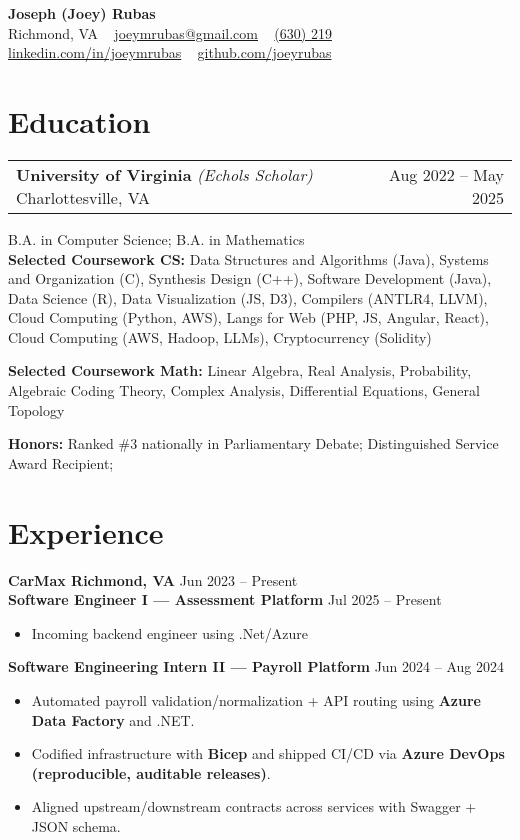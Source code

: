\documentclass[11pt]{article}
\makeatletter
\newcommand{\NameSize}{18}
\newcommand{\NameLead}{20}
\newcommand{\NameWeight}{\bfseries}
\newcommand{\ContactSize}{10}
\newcommand{\ContactLead}{12}
\newcommand{\ContactSep}{\; \textbar\ \;}  %
\newcommand{\EmployerSize}{11}
\newcommand{\EmployerLead}{13}
\newcommand{\EmployerWeight}{\bfseries}
\newcommand{\EmployerPreSkip}{2pt}
\newcommand{\EmployerPostSkip}{-2pt}
\newcommand{\RoleTitleSize}{11}
\newcommand{\RoleTitleLead}{13}
\newcommand{\RoleTitleWeight}{\bfseries}
\newcommand{\RoleDateSize}{10}
\newcommand{\RoleDateLead}{12}
\newcommand{\RolePreSkip}{2pt}
\newcommand{\RolePostSkip}{-8pt}
\newcommand{\BulletSize}{10}
\newcommand{\BulletLead}{12}
\newenvironment{twocol}[2]{%
  \noindent\begin{tabular*}{\textwidth}{@{\extracolsep{\fill}} l r}
  #1 & #2\\
  \end{tabular*}\ignorespaces
}{\par}
\newcommand{\NameLine}[1]{%
  {\fontsize{\NameSize}{\NameLead}\selectfont \NameWeight #1}%
}
\newcommand{\ContactsLine}[1]{%
  {\fontsize{\ContactSize}{\ContactLead}\selectfont #1}%
}
\newcommand{\EmployerHeader}[2]{%
  \vspace*{\EmployerPreSkip}%
  \noindent
  {\fontsize{\EmployerSize}{\EmployerLead}\selectfont \EmployerWeight #1}%
  \hfill
  {\fontsize{\EmployerSize}{\EmployerLead}\selectfont #2}%
  \\[\EmployerPostSkip]%
}
\newcommand{\RoleHeader}[2]{%
  \vspace*{\RolePreSkip}%
  \noindent
  {\fontsize{\RoleTitleSize}{\RoleTitleLead}\selectfont \RoleTitleWeight #1}%
  \hfill
  {\fontsize{\RoleDateSize}{\RoleDateLead}\selectfont #2}%
  \\[\RolePostSkip]%
}
\newenvironment{ResumeItemize}{%
  \begin{itemize}\fontsize{\BulletSize}{\BulletLead}\selectfont
}{%
  \end{itemize}
}
\makeatother
\begin{document}
\pagestyle{empty}       
\raggedbottom          
\begin{center}
  \NameLine{Joseph (Joey) Rubas}\\[2pt]
  \ContactsLine{%
    Richmond, VA \ContactSep
    \href{mailto:joeymrubas@gmail.com}{joeymrubas@gmail.com} \ContactSep
    \href{tel:+16302199451}{(630) 219\textendash 9451} \ContactSep
    \href{https://www.linkedin.com/in/joeymrubas/}{linkedin.com/in/joeymrubas} \ContactSep
    \href{https://github.com/joeyrubas}{github.com/joeyrubas}%
  }
\end{center}

\section{Education}
\begin{twocol}{\textbf{University of Virginia} \textit{(Echols Scholar)} \quad Charlottesville, VA}{Aug 2022 -- May 2025}\end{twocol}
B.A. in Computer Science; B.A. in Mathematics \\
\textbf{Selected Coursework CS:} Data Structures and Algorithms (Java), Systems and Organization (C), Synthesis Design (C++), Software Development (Java), Data Science (R), Data Visualization (JS, D3), Compilers (ANTLR4, LLVM), Cloud Computing (Python, AWS), Langs for Web (PHP, JS, Angular, React), Cloud Computing (AWS, Hadoop, LLMs), Cryptocurrency (Solidity) 

\textbf{Selected Coursework Math:} Linear Algebra, Real Analysis, Probability, Algebraic Coding Theory, Complex Analysis, Differential Equations, General Topology

\textbf{Honors:} Ranked \( \# \)3 nationally in Parliamentary Debate; Distinguished Service Award Recipient; 

\section{Experience}

\EmployerHeader{CarMax \quad Richmond, VA}{Jun 2023 -- Present}
\RoleHeader{Software Engineer I — Assessment Platform}{Jul 2025 -- Present}
\begin{ResumeItemize}
  \item Incoming backend engineer using .Net/Azure
\end{ResumeItemize}

\RoleHeader{Software Engineering Intern II — Payroll Platform}{Jun 2024 -- Aug 2024}
\begin{ResumeItemize}
  \item Automated payroll validation/normalization + API routing using \textbf{Azure Data Factory} and .NET.
  \item Codified infrastructure with \textbf{Bicep} and shipped CI/CD via \textbf{Azure DevOps} \textbf{(reproducible, auditable releases)}.
  \item Aligned upstream/downstream contracts across services with Swagger + JSON schema.
\end{ResumeItemize}
\end{document}
